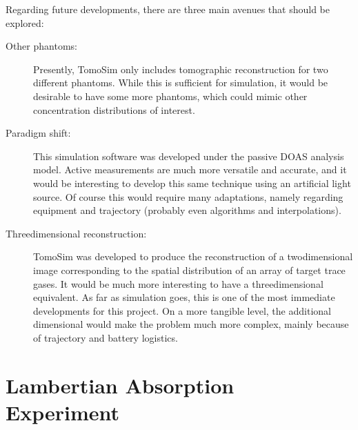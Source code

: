 Regarding future developments, there are three main avenues that should
be explored: 
\begin{description}

    \item[Other phantoms:] Presently, TomoSim only includes tomographic
        reconstruction for two different phantoms.  While this is
        sufficient for simulation, it would be desirable to have some
        more phantoms, which could mimic other concentration
        distributions of interest.

    \item[Paradigm shift:] This simulation software was developed under
        the passive DOAS analysis model. Active measurements are much
        more versatile and accurate, and it would be interesting to
        develop this same technique using an artificial light source. Of
        course this would require many adaptations, namely regarding
        equipment and trajectory (probably even algorithms and
        interpolations).

    \item[Threedimensional reconstruction:] TomoSim was developed to
        produce the reconstruction of a twodimensional image
        corresponding to the spatial distribution of an array of target
        trace gases. It would be much more interesting to have a
        threedimensional equivalent. As far as simulation goes, this is
        one of the most immediate developments for this project. On a
        more tangible level, the additional dimensional would make the
        problem much more complex, mainly because of trajectory and
        battery logistics.
\end{description}

\section{Lambertian Absorption Experiment}%
\label{sec:lambertian_absorption_experiment}

